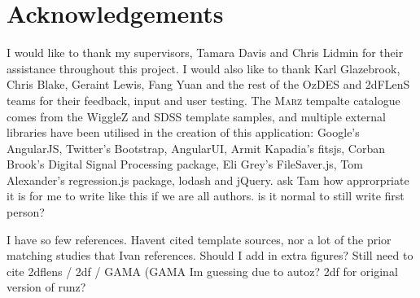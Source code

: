 \documentclass[iop]{emulateapj}
\newcommand{\green}{\color{LimeGreen}}
\newcommand{\marz}{\textsc{Marz}}
\begin{document}
\section*{Acknowledgements}
I would like to thank my supervisors, Tamara Davis and Chris Lidmin for their assistance throughout this project. I would also like to thank Karl Glazebrook, Chris Blake, Geraint Lewis, Fang Yuan and the rest of the OzDES and 2dFLenS teams for their feedback, input and user testing. The \marz{} tempalte catalogue comes from the WiggleZ and SDSS template samples, and multiple external libraries have been utilised in the creation of this application: Google's AngularJS, Twitter's Bootstrap, AngularUI, Armit Kapadia's fitsjs, Corban Brook's Digital Signal Processing package, Eli Grey's FileSaver.js, Tom Alexander's regression.js package, lodash and jQuery. {\green ask Tam how approrpriate it is for me to write like this if we are all authors. is it normal to still write first person?}

{\green I have so few references. Havent cited template sources, nor a lot of the prior matching studies that Ivan references. Should I add in extra figures? Still need to cite 2dflens / 2df / GAMA (GAMA Im guessing due to autoz? 2df for original version of runz?}


\end{document}

